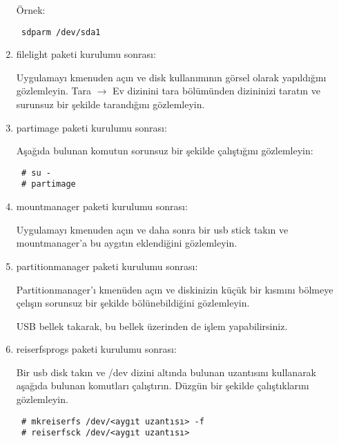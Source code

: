 \documentclass[a4paper,10pt]{article}
\begin{document}
\begin{enumerate}
Örnek:
\begin{verbatim}
 sdparm /dev/sda1
\end{verbatim}


\item filelight paketi kurulumu sonrası:

Uygulamayı kmenuden açın ve disk kullanımının görsel olarak yapıldığını gözlemleyin. Tara $\rightarrow$ Ev dizinini tara bölümünden dizininizi taratın ve surunsuz bir şekilde tarandığını gözlemleyin.
 \item partimage paketi kurulumu sonrası:

Aşağıda bulunan komutun sorunsuz bir şekilde çalıştığını gözlemleyin:
\begin{verbatim}
 # su -
 # partimage
\end{verbatim}

 \item mountmanager paketi kurulumu sonrası:

Uygulamayı kmenuden açın ve daha sonra bir usb stick takın ve mountmanager'a bu aygıtın eklendiğini gözlemleyin.
 \item partitionmanager paketi kurulumu sonrası:

Partitionmanager'ı kmenüden açın ve diskinizin küçük bir kısmını bölmeye çelışın sorunsuz bir şekilde bölünebildiğini gözlemleyin.

USB bellek takarak, bu bellek üzerinden de işlem yapabilirsiniz.

\item reiserfsprogs paketi kurulumu sonrası:

Bir usb disk takın ve /dev dizini altında bulunan uzantısını kullanarak aşağıda bulunan komutları çalıştırın. Düzgün bir şekilde çalıştıklarını gözlemleyin. 

\begin{verbatim}
 # mkreiserfs /dev/<aygıt uzantısı> -f
 # reiserfsck /dev/<aygıt uzantısı>
\end{verbatim}

\end{enumerate}
\end{document}
